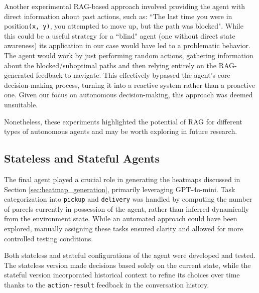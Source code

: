 Another experimental RAG-based approach involved providing the agent with direct
information about past actions, such as: ``The last time you were in position\texttt{(x,
y)}, you attempted to move up, but the path was blocked". While this could be a
useful strategy for a ``blind" agent (one without direct state awareness) its application
in our case would have led to a problematic behavior. The agent would work by
just performing random actions, gathering information about the blocked/suboptimal
paths and then relying entirely on the RAG-generated feedback to navigate. This
effectively bypassed the agent's core decision-making process, turning it into a
reactive system rather than a proactive one. Given our focus on autonomous
decision-making, this approach was deemed unsuitable.

Nonetheless, these experiments highlighted the potential of RAG for different
types of autonomous agents and may be worth exploring in future research.

\subsection{Stateless and Stateful Agents}

The final agent played a crucial role in generating the heatmaps discussed in Section
\ref{sec:heatmap_generation}, primarily leveraging GPT-4o-mini. Task categorization
into \texttt{pickup} and \texttt{delivery} was handled by computing the number of
parcels currently in possession of the agent, rather than inferred dynamically
from the environment state. While an automated approach could have been explored,
manually assigning these tasks ensured clarity and allowed for more controlled
testing conditions.

Both stateless and stateful configurations of the agent were developed and
tested. The stateless version made decisions based solely on the current state,
while the stateful version incorporated historical context to refine its choices
over time thanks to the \texttt{action-result} feedback in the conversation history.


